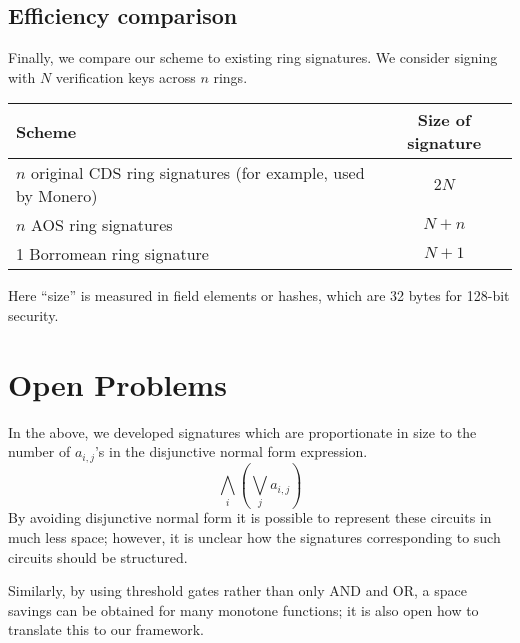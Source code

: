 \documentclass[letterpaper]{article}
\begin{document}
\subsection{Efficiency comparison}

Finally, we compare our scheme to existing ring signatures. We consider signing
with $N$ verification keys across $n$ rings.

\begin{center}
\begin{tabular}{|l|c|}
\hline
\textbf{Scheme} & \textbf{Size of signature}	\\
\hline
\parbox[t]{6cm}{$n$ original CDS ring signatures\cite{cramer+damgard+schoenmakers1994}\\
(for example, used by Monero)} & $2N$	\\
\hline
$n$ AOS ring signatures & $N + n$	\\
 Borromean ring signature & $N + 1$	\\
\hline
\end{tabular}
\end{center}
Here ``size'' is measured in field elements or hashes, which are 32 bytes for
128-bit security.

\section{Open Problems}

In the above, we developed signatures which are proportionate in size to the
number of $a_{i,j}$'s in the disjunctive normal form expression.
\[ \bigwedge_i \left(\bigvee_j a_{i,j}\right) \]
By avoiding disjunctive normal form it is possible to represent these circuits
in much less space; however, it is unclear how the signatures corresponding
to such circuits should be structured.

Similarly, by using threshold gates rather than only AND and OR, a space
savings can be obtained for many monotone functions; it is also open how to
translate this to our framework.


\nolinenumbers
\clearpage


\end{document}
